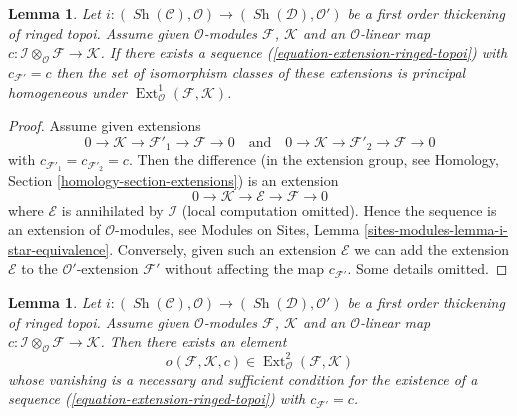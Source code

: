 \documentclass{stacks-project}
\theoremstyle{plain}
\newtheorem{lemma}[subsection]{Lemma}
\theoremstyle{definition}
\theoremstyle{remark}
\numberwithin{equation}{subsection}
\def\Ext{\mathop{\mathrm{Ext}}\nolimits}
\def\Sh{\mathop{\mathit{Sh}}\nolimits}
\begin{document}
\begin{lemma}
\label{lemma-inf-ext-ringed-topoi}
Let $i : (\Sh(\mathcal{C}), \mathcal{O}) \to (\Sh(\mathcal{D}), \mathcal{O}')$
be a first order thickening of ringed topoi. Assume given
$\mathcal{O}$-modules $\mathcal{F}$, $\mathcal{K}$
and an $\mathcal{O}$-linear map
$c : \mathcal{I} \otimes_\mathcal{O} \mathcal{F} \to \mathcal{K}$.
If there exists a sequence (\ref{equation-extension-ringed-topoi}) with
$c_{\mathcal{F}'} = c$ then the set of isomorphism classes of these
extensions is principal homogeneous under
$\Ext^1_\mathcal{O}(\mathcal{F}, \mathcal{K})$.
\end{lemma}

\begin{proof}
Assume given extensions
$$
0 \to \mathcal{K} \to \mathcal{F}'_1 \to \mathcal{F} \to 0
\quad\text{and}\quad
0 \to \mathcal{K} \to \mathcal{F}'_2 \to \mathcal{F} \to 0
$$
with $c_{\mathcal{F}'_1} = c_{\mathcal{F}'_2} = c$. Then the difference
(in the extension group, see
Homology, Section \ref{homology-section-extensions})
is an extension
$$
0 \to \mathcal{K} \to \mathcal{E} \to \mathcal{F} \to 0
$$
where $\mathcal{E}$ is annihilated by $\mathcal{I}$ (local computation
omitted). Hence the sequence is an extension of $\mathcal{O}$-modules,
see Modules on Sites, Lemma \ref{sites-modules-lemma-i-star-equivalence}.
Conversely, given such an extension $\mathcal{E}$ we can add the extension
$\mathcal{E}$ to the $\mathcal{O}'$-extension $\mathcal{F}'$ without
affecting the map $c_{\mathcal{F}'}$. Some details omitted.
\end{proof}

\begin{lemma}
\label{lemma-inf-obs-ext-ringed-topoi}
Let $i : (\Sh(\mathcal{C}), \mathcal{O}) \to (\Sh(\mathcal{D}), \mathcal{O}')$
be a first order thickening of ringed topoi. Assume given
$\mathcal{O}$-modules $\mathcal{F}$, $\mathcal{K}$
and an $\mathcal{O}$-linear map
$c : \mathcal{I} \otimes_\mathcal{O} \mathcal{F} \to \mathcal{K}$.
Then there exists an element
$$
o(\mathcal{F}, \mathcal{K}, c) \in
\Ext^2_\mathcal{O}(\mathcal{F}, \mathcal{K})
$$
whose vanishing is a necessary and sufficient condition for the existence
of a sequence (\ref{equation-extension-ringed-topoi})
with $c_{\mathcal{F}'} = c$.
\end{lemma}
\end{document}
